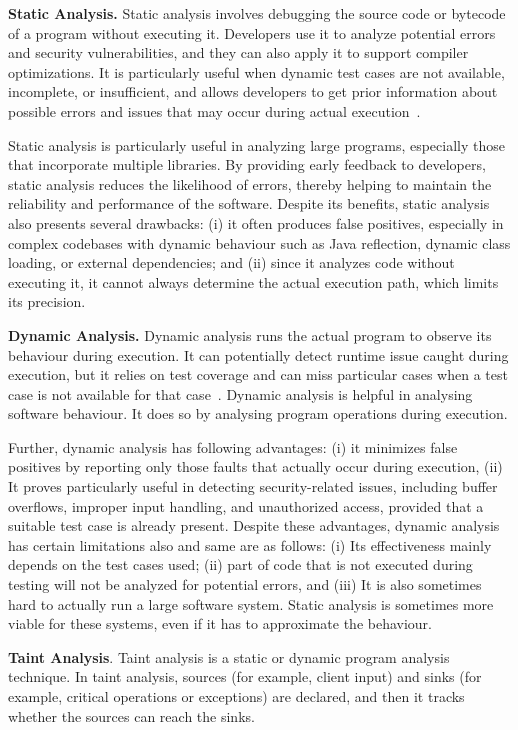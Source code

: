 \textbf{Static Analysis.} Static analysis involves debugging the source code or bytecode
of a program without executing it. Developers use it to analyze potential errors and
security vulnerabilities, and they can also apply it to support compiler optimizations.
It is particularly useful when dynamic test cases are not available,
incomplete, or insufficient, and allows developers to get prior information about possible
errors and issues that may occur during actual execution~\cite{Rahaman2023}.

Static analysis is particularly useful in analyzing large programs, especially those that
incorporate multiple libraries. By providing early feedback to developers,
static analysis reduces the likelihood of errors, thereby helping to maintain the reliability
and performance of the software. Despite its benefits, static analysis also presents several
drawbacks: (i) it often produces false positives, especially in complex codebases with dynamic
behaviour such as Java reflection, dynamic class loading, or external dependencies; and (ii)
since it analyzes code without executing it, it cannot always determine the actual execution
path, which limits its precision.

\textbf{Dynamic Analysis.} Dynamic analysis runs the actual program to observe its
behaviour during execution. It can potentially detect runtime issue caught
during execution, but it relies on test coverage and can miss particular cases when a test
case is not available for that case~\cite{Kuliamin2024}. Dynamic analysis is helpful in analysing software
behaviour. It does so by analysing program operations during execution.

Further, dynamic analysis has following advantages: (i) it minimizes false positives by reporting only those faults that actually
occur during execution, (ii) It proves particularly useful in detecting security-related issues,
including buffer overflows, improper input handling, and unauthorized access, provided that a
suitable test case is already present. Despite these advantages, dynamic analysis has certain limitations
also and same are as follows: (i) Its effectiveness mainly depends on the test cases used;
(ii) part of code that is not executed during testing will not be analyzed for potential
errors, and (iii) It is also sometimes hard to actually run a large software system. Static
analysis is sometimes more viable for these systems, even if it has to approximate the behaviour.

\textbf{Taint Analysis}. Taint analysis is a static or dynamic program analysis technique.
In taint analysis, sources (for example, client input) and sinks (for example, critical
operations or exceptions) are declared, and then it tracks whether the sources can reach the sinks.


